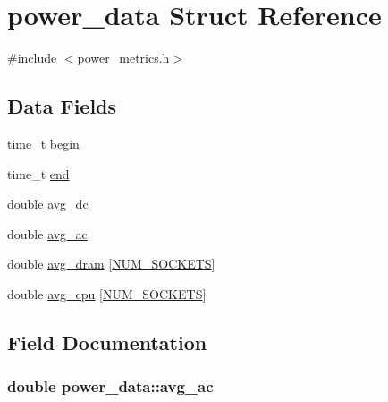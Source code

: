 \hypertarget{structpower__data}{}\section{power\+\_\+data Struct Reference}
\label{structpower__data}


{\ttfamily \#include $<$power\+\_\+metrics.\+h$>$}

\subsection*{Data Fields}
\begin{DoxyCompactItemize}
\item 
time\+\_\+t \hyperlink{structpower__data_afa9f8e3bb7aad76d4c6480735c0e6f74}{begin}
\item 
time\+\_\+t \hyperlink{structpower__data_a4502036bc99f455f00974cadfb642a11}{end}
\item 
double \hyperlink{structpower__data_af27803e682e8f281c1d108af766b739d}{avg\+\_\+dc}
\item 
double \hyperlink{structpower__data_a6be0998c821a1f4dd0a29873052e6bf6}{avg\+\_\+ac}
\item 
double \hyperlink{structpower__data_a3312f37327970fc86b32128e464885a6}{avg\+\_\+dram} \mbox{[}\hyperlink{power__metrics_8h_a1c803e4ececfb47d2791c9283c85eb00}{N\+U\+M\+\_\+\+S\+O\+C\+K\+E\+TS}\mbox{]}
\item 
double \hyperlink{structpower__data_a47b28e3d302b9ac37fb948b653a74274}{avg\+\_\+cpu} \mbox{[}\hyperlink{power__metrics_8h_a1c803e4ececfb47d2791c9283c85eb00}{N\+U\+M\+\_\+\+S\+O\+C\+K\+E\+TS}\mbox{]}
\end{DoxyCompactItemize}


\subsection{Field Documentation}
\subsubsection[{\texorpdfstring{avg\+\_\+ac}{avg_ac}}]{\setlength{\rightskip}{0pt plus 5cm}double power\+\_\+data\+::avg\+\_\+ac}\hypertarget{structpower__data_a6be0998c821a1f4dd0a29873052e6bf6}{}\label{structpower__data_a6be0998c821a1f4dd0a29873052e6bf6}
